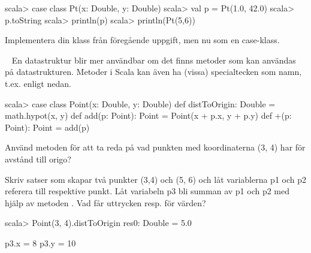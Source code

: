 \begin{REPL}
scala> case class Pt(x: Double, y: Double)
scala> val p = Pt(1.0, 42.0)
scala> p.toString
scala> println(p)
scala> println(Pt(5,6))
\end{REPL}

\Subtask Implementera din klass  från föregående uppgift, men nu som en case-klass.

\SOLUTION


\TaskSolved \what
 
\SubtaskSolved  {}


\QUESTEND









\QUESTBEGIN

\Task \label{task:point} \what~   En datastruktur blir mer användbar om det finns metoder som kan användas på datastrukturen. Metoder i Scala kan även ha (vissa) specialtecken som namn, t.ex. \code{+} enligt nedan.
\begin{REPL}
scala> case class Point(x: Double, y: Double) {
         def distToOrigin: Double = math.hypot(x, y)
         def add(p: Point): Point = Point(x + p.x, y + p.y)
         def +(p: Point): Point = add(p)
       }
\end{REPL}

\Subtask Använd metoden  för att ta reda på vad punkten med koordinaterna (3, 4) har för avstånd till origo?

\Subtask Skriv satser som skapar två punkter (3,4) och (5, 6) och låt variablerna p1 och p2 referera till respektive punkt. Låt variabeln p3 bli summan av p1 och p2 med hjälp av metoden . Vad får uttrycken  resp.  för värden?



\SOLUTION


\TaskSolved \what
 

\SubtaskSolved 
\begin{REPLnonum}
scala> Point(3, 4).distToOrigin
res0: Double = 5.0
\end{REPLnonum}

\SubtaskSolved 
p3.x = 8
p3.y = 10


\QUESTEND








